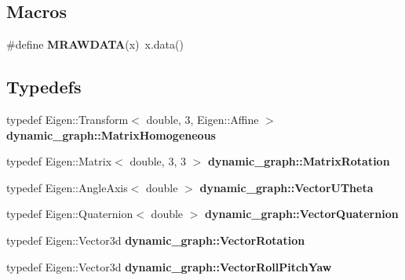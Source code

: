 \subsection*{Macros}
\begin{DoxyCompactItemize}
\item 
\#define {\bfseries M\+R\+A\+W\+D\+A\+TA}(x)~x.\+data()\hypertarget{matrix__geometry_8hh_a57a66b4c84cff81707e398b940e1ef68}{}\label{matrix__geometry_8hh_a57a66b4c84cff81707e398b940e1ef68}

\end{DoxyCompactItemize}
\subsection*{Typedefs}
\begin{DoxyCompactItemize}
\item 
typedef Eigen\+::\+Transform$<$ double, 3, Eigen\+::\+Affine $>$ {\bfseries dynamic\+\_\+graph\+::\+Matrix\+Homogeneous}\hypertarget{namespacedynamic__graph_a1cf832cafc093c1600db8cc4436661bb}{}\label{namespacedynamic__graph_a1cf832cafc093c1600db8cc4436661bb}

\item 
typedef Eigen\+::\+Matrix$<$ double, 3, 3 $>$ {\bfseries dynamic\+\_\+graph\+::\+Matrix\+Rotation}\hypertarget{namespacedynamic__graph_a50d1b342105103d3078687b78d5e8197}{}\label{namespacedynamic__graph_a50d1b342105103d3078687b78d5e8197}

\item 
typedef Eigen\+::\+Angle\+Axis$<$ double $>$ {\bfseries dynamic\+\_\+graph\+::\+Vector\+U\+Theta}\hypertarget{namespacedynamic__graph_aabaea0c174dde41c755e8d3fb6d23caa}{}\label{namespacedynamic__graph_aabaea0c174dde41c755e8d3fb6d23caa}

\item 
typedef Eigen\+::\+Quaternion$<$ double $>$ {\bfseries dynamic\+\_\+graph\+::\+Vector\+Quaternion}\hypertarget{namespacedynamic__graph_a9f22f1c9369a98e94778717faeec3f4b}{}\label{namespacedynamic__graph_a9f22f1c9369a98e94778717faeec3f4b}

\item 
typedef Eigen\+::\+Vector3d {\bfseries dynamic\+\_\+graph\+::\+Vector\+Rotation}\hypertarget{namespacedynamic__graph_afe3e8341b18b6a3b59f2fa579c2e12c1}{}\label{namespacedynamic__graph_afe3e8341b18b6a3b59f2fa579c2e12c1}

\item 
typedef Eigen\+::\+Vector3d {\bfseries dynamic\+\_\+graph\+::\+Vector\+Roll\+Pitch\+Yaw}\hypertarget{namespacedynamic__graph_af84ad658e1cf7d496958772210dd51b6}{}\label{namespacedynamic__graph_af84ad658e1cf7d496958772210dd51b6}


\end{DoxyCompactItemize}
